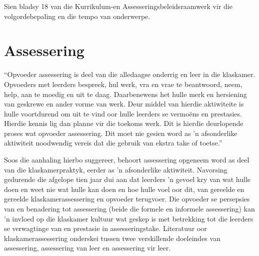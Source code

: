Sien bladsy 18 van die Kurrikulum-en Assesseringsbeleidsraamwerk vir die volgordebepaling en die tempo van onderwerpe.

\section{Assessering}
``Opvoeder assessering is deel van die alledaagse onderrig en leer in die klaskamer. Opvoeders met leerders bespreek, hul werk, vra en vrae te beantwoord, neem, help, aan te moedig en uit te daag.
Daarbenewens het hulle merk en hersiening van geskrewe en ander vorme van werk. Deur middel van hierdie aktiwiteite is hulle voortdurend om uit te vind oor hulle leerders se vermoëns en prestasies. Hierdie kennis lig dan planne vir die toekoms werk. Dit is hierdie deurlopende proses wat opvoeder assessering. Dit moet nie gesien word as 'n afsonderlike aktiwiteit noodwendig vereis dat die gebruik van ekstra take of toetse.''

Soos die aanhaling hierbo suggereer, behoort assessering opgeneem word as deel van die klaskamerpraktyk, eerder as 'n afsonderlike aktiwiteit. Navorsing gedurende die afgelope tien jaar dui aan dat leerders 'n gevoel kry van wat hulle doen en weet nie wat hulle kan doen en hoe hulle voel oor dit, van gereelde en gereelde klaskamerassessering en opvoeder terugvoer. Die opvoeder se persepsies van en benadering tot assessering (beide die formele en informele assessering) kan 'n invloed op die klaskamer kultuur wat geskep is met betrekking tot die leerders se verwagtinge van en prestasie in assesseringstake. Literatuur oor klaskamerassessering onderskei tussen twee verskillende doeleindes van assessering, assessering van leer en assessering vir leer.

